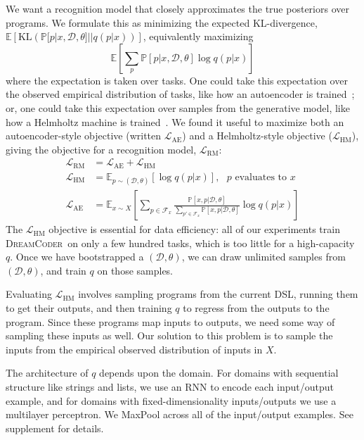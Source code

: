 \documentclass{article}
\newcommand{\system}{\textsc{DreamCoder}~}
\newcommand{\expect}{\mathds{E}} %
\newcommand{\probability}{\mathds{P}} %
\begin{document}
We want a recognition model that closely approximates the true posteriors over programs. We formulate this as minimizing the expected KL-divergence, $  \expect\left[\text{KL}\left(\probability[p|x,\mathcal{D},\theta]||q(p|x) \right) \right]$,
equivalently maximizing
\begin{equation*}
  \expect\left[\sum_p\probability[p|x,\mathcal{D},\theta]\log q(p|x) \right]
\end{equation*}
where the expectation is taken over tasks. One could take this expectation
over the observed empirical distribution of tasks,
like how an autoencoder is trained~\cite{hinton2006reducing}; or, one could take this expectation over samples from the generative model, like how a Helmholtz machine is trained~\cite{dayan1995helmholtz}.
We found it useful to maximize both an autoencoder-style objective (written $\mathcal{L}_{\text{AE}}$) and a Helmholtz-style objective ($\mathcal{L}_{\text{HM}}$), giving the  objective for a recognition model, $\mathcal{L}_{\text{RM}}$:
\begin{align}
\mathcal{L}_{\text{RM}}& = \mathcal{L}_\text{AE} + \mathcal{L}_\text{HM}\\
\mathcal{L}_{\text{HM}}& = \expect_{p\sim(\mathcal{D},\theta) }\left[\log q(p|x)\right],\text{ $p$ evaluates to $x$}\nonumber\\
\mathcal{L}_{\text{AE}}& = \expect_{x\sim X}\left[\sum_{p\in \mathcal{F}_x}
  \frac{\probability\left[x,p|\mathcal{D},\theta \right]}{\sum_{p'\in \mathcal{F}_x}\probability\left[x,p|\mathcal{D},\theta \right]}\log q(p|x)\right]\nonumber
\end{align}
The $\mathcal{L}_{\text{HM}}$ objective is essential for data efficiency:
all of our experiments train \system on only a few hundred tasks, which is too little for
a high-capacity $q$.
Once we have bootstrapped a $(\mathcal{D},\theta)$,
we can draw unlimited samples from $(\mathcal{D},\theta)$,
and train $q$ on those samples.

Evaluating $\mathcal{L}_{\text{HM}}$ involves sampling programs from
the current DSL, running them to get their outputs,
and then training $q$ to regress from the outputs to the program.
Since these programs map inputs to outputs,
we need some way of sampling these inputs as well.
Our solution to this problem is to sample the inputs
from the empirical observed distribution of inputs in $X$.

The architecture of $q$ depends upon the domain.
For domains with sequential structure like strings and lists,
we use an RNN to encode each input/output example,
and for domains with fixed-dimensionality inputs/outputs we use a multilayer perceptron.
We MaxPool across all of the input/output examples. See supplement for details.
\end{document}
